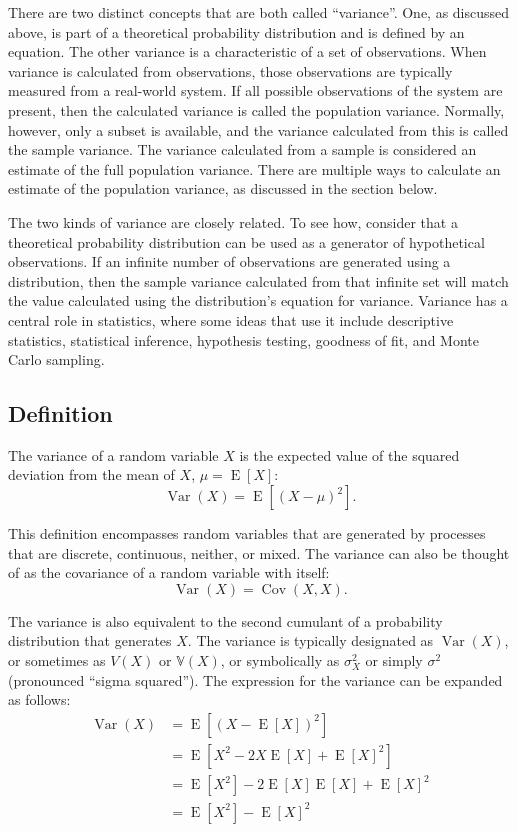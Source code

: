 There are two distinct concepts that are both called
``variance''. One, as discussed above, is part of a theoretical
probability distribution and is defined by an equation. The other
variance is a characteristic of a set of observations. When variance
is calculated from observations, those observations are typically
measured from a real-world system. If all possible observations of the
system are present, then the calculated variance is called the
population variance. Normally, however, only a subset is available,
and the variance calculated from this is called the sample
variance. The variance calculated from a sample is considered an
estimate of the full population variance. There are multiple ways to
calculate an estimate of the population variance, as discussed in the
section below.

The two kinds of variance are closely related. To see how, consider
that a theoretical probability distribution can be used as a generator
of hypothetical observations. If an infinite number of observations
are generated using a distribution, then the sample variance
calculated from that infinite set will match the value calculated
using the distribution's equation for variance. Variance has a central
role in statistics, where some ideas that use it include descriptive
statistics, statistical inference, hypothesis testing, goodness of
fit, and Monte Carlo sampling.


\subsection{Definition}\label{definition}

The variance of a random variable $X$ is the expected value of the
squared deviation from the mean of $X$, $\mu = \operatorname{E}[X]$:
$$\operatorname{Var}(X) = \operatorname{E}\left[(X - \mu)^2 \right].$$

This definition encompasses random variables that are generated by
processes that are discrete, continuous, neither, or mixed. The
variance can also be thought of as the covariance of a random variable
with itself:
$$\operatorname{Var}(X) = \operatorname{Cov}(X, X).$$

The variance is also equivalent to the second cumulant of a
probability distribution that generates $X$. The variance is typically
designated as $\operatorname{Var}(X)$, or sometimes as $V(X)$ or
$\mathbb{V}(X)$, or symbolically as $\sigma^2_X$ or simply
$\sigma^2$ (pronounced ``sigma squared''). The expression for the
variance can be expanded as follows:
\begin{align*}
\operatorname{Var}(X) &= \operatorname{E}\left[(X - \operatorname{E}[X])^2\right] \\
&= \operatorname{E}\left[X^2 - 2X\operatorname{E}[X] + \operatorname{E}[X]^2\right] \\
&= \operatorname{E}\left[X^2\right] - 2\operatorname{E}[X]\operatorname{E}[X] + \operatorname{E}[X]^2 \\
&= \operatorname{E}\left[X^2 \right] - \operatorname{E}[X]^2
\end{align*}

